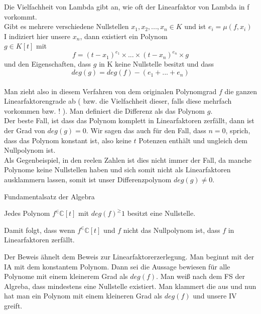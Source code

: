 \documentclass[headsepline,12pt,a4paper]{scrartcl}
\begin{document}
Die Vielfachheit von Lambda gibt an, wie oft der Linearfaktor von Lambda in f vorkommt. \\
Gibt es mehrere verschiedene Nullstellen $x_1 , x_2 , ... , x_n  \in K $ und ist $e_i = \mu(f, x_i) $ I indiziert hier unsere $x_n$, dann existiert ein Polynom \\
$g\in K[t]$ mit 
$$ f = (t-x_1)^{e_1} \times ... \times (t-x_n)^{e_n} \times g $$ und den Eigenschaften, dass $g$ in K keine Nullstelle besitzt und dass 
$$ deg(g) = deg(f) - (e_1+...+e_n) $$ \\

Man zieht also in diesem Verfahren von dem originalen Polynomgrad $f$ die ganzen Linearfaktorengrade ab ( bzw. die Vielfachheit dieser, falls diese mehrfach vorkommen bzw. ! ). Man definiert die Differenz als das Polynom $g$. \\

Der beste Fall, ist dass das Polynom komplett in Linearfaktoren zerfällt, dann ist der Grad von $deg(g)=0$. Wir sagen das auch für den Fall, dass $n=0$, sprich, dass das Polynom konstant ist, also keine $t$ Potenzen enthält und ungleich dem Nullpolynom ist. \\

Als Gegenbeispiel, in den reelen Zahlen ist dies nicht immer der Fall, da manche Polynome keine Nullstellen haben und sich somit nicht als Linearfaktoren ausklammern lassen, somit ist unser Differenzpolynom $deg(g) \neq 0 $. \\

\begin{center}
\item[Fundamentalsatz der Algebra]
\end{center}
\item Jedes Polynom $f ^\in \mathbb{C}[t]$ mit $deg(f) ^\geq 1 $ besitzt eine Nullstelle. \\
\item Damit folgt, dass wenn $f ^\in \mathbb{C}[t]$ und $f$ nicht das Nullpolynom ist, dass $f$ in Linearfaktoren zerfällt.
\item Der Beweis ähnelt dem Beweis zur Linearfaktorerzerlegung. Man beginnt mit der IA mit dem konstantem Polynom. Dann sei die Aussage bewiesen für alle Polynome mit einem kleinerem Grad als $deg(f)$. Man weiß nach dem FS der Algreba, dass mindestens eine Nullstelle existiert. Man klammert die aus und nun hat man ein Polynom mit einem kleineren Grad als $deg(f)$ und unsere IV greift.  \\
\end{document}
